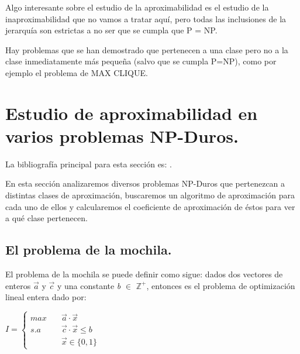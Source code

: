 \documentclass[a4paper,12pt,titlepage]{article}
\begin{document}
\vspace{\baselineskip}

Algo interesante sobre el estudio de la aproximabilidad es el estudio de la inaproximabilidad que no vamos a tratar aqu\'i, pero todas las inclusiones de la jerarqu\'ia son estrictas a no ser que se cumpla que P = NP.

Hay problemas que se han demostrado que pertenecen a una clase pero no a la clase inmediatamente m\'as pequeña (salvo que se cumpla P=NP), como por ejemplo el problema de MAX CLIQUE\cite{MAX_CLIQ_INA}.

\newpage

\section{Estudio de aproximabilidad en varios problemas NP-Duros.}
\label{sec:problemas}

La bibliograf\'ia principal para esta secci\'on es: \cite{approx_core}.

\vspace{0.3cm}

En esta secci\'on analizaremos diversos problemas NP-Duros que pertenezcan a distintas clases de aproximaci\'on, buscaremos un algoritmo de aproximaci\'on para cada uno de ellos y calcularemos el coeficiente de aproximaci\'on de \'estos para ver a qu\'e clase pertenecen.

\subsection{El problema de la mochila.}

El problema de la mochila se puede definir como sigue:
dados dos vectores de enteros $\overrightarrow{a}$ y $\overrightarrow{c}$ y una constante \textit{b} $\in$ $\mathbb{Z^+}$, entonces es el problema de optimizaci\'on lineal entera dado por:

\vspace{0.3cm}

$
I =
\left\{\begin{aligned}
max \quad & \overrightarrow{a}\cdot\overrightarrow{x} \\
s.a \quad & \overrightarrow{c}\cdot\overrightarrow{x} \leq \textit{b} \\
    & \overrightarrow{x} \in \{0,1\}
\end{aligned}\right.
$

\vspace{0.3cm}
\end{document}
